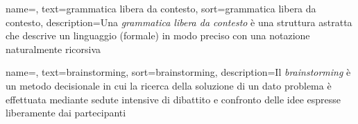{
	name=,
	text=grammatica libera da contesto,
	sort=grammatica libera da contesto,
	description={Una \emph{grammatica libera da contesto} è una struttura astratta che descrive un linguaggio (formale) in modo preciso con una notazione naturalmente ricorsiva}
}

{
	name=,
	text=brainstorming,
	sort=brainstorming,
	description={Il \emph{brainstorming} è un metodo decisionale in cui la ricerca della soluzione di un dato problema è effettuata mediante sedute intensive di dibattito e confronto delle idee espresse liberamente dai partecipanti}
}

